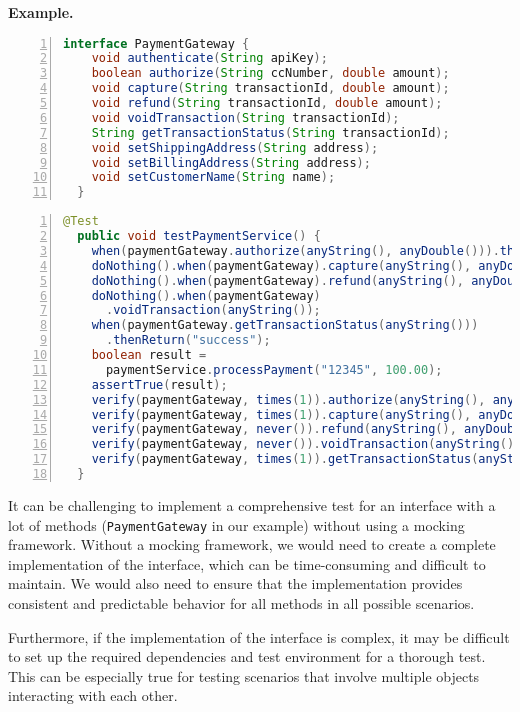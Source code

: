\documentclass[conference]{IEEEtran}
\begin{document}
\textbf{Example. }
\begin{lstlisting}[basicstyle=\ttfamily,
numbers=left,numbersep=0pt,basicstyle=\scriptsize\ttfamily,language = Java, framesep=4.5mm, framexleftmargin=1.0mm, captionpos=b, escapechar=|, morekeywords={@Test}]
  interface PaymentGateway {
    void authenticate(String apiKey);
    boolean authorize(String ccNumber, double amount);
    void capture(String transactionId, double amount);
    void refund(String transactionId, double amount);
    void voidTransaction(String transactionId);
    String getTransactionStatus(String transactionId);
    void setShippingAddress(String address);
    void setBillingAddress(String address);
    void setCustomerName(String name);
  }
\end{lstlisting}

\begin{lstlisting}[basicstyle=\ttfamily,
numbers=left,numbersep=0pt,basicstyle=\scriptsize\ttfamily,language = Java, framesep=4.5mm, framexleftmargin=1.0mm, captionpos=b, escapechar=|, morekeywords={@Test}]
  @Test
  public void testPaymentService() {
    when(paymentGateway.authorize(anyString(), anyDouble())).thenReturn(true);
    doNothing().when(paymentGateway).capture(anyString(), anyDouble());
    doNothing().when(paymentGateway).refund(anyString(), anyDouble());
    doNothing().when(paymentGateway)
      .voidTransaction(anyString());
    when(paymentGateway.getTransactionStatus(anyString()))
      .thenReturn("success");
    boolean result = 
      paymentService.processPayment("12345", 100.00);
    assertTrue(result);
    verify(paymentGateway, times(1)).authorize(anyString(), anyDouble());
    verify(paymentGateway, times(1)).capture(anyString(), anyDouble());
    verify(paymentGateway, never()).refund(anyString(), anyDouble());
    verify(paymentGateway, never()).voidTransaction(anyString());
    verify(paymentGateway, times(1)).getTransactionStatus(anyString());
  }
\end{lstlisting}

It can be challenging to implement a comprehensive test for an interface with a lot of methods (\texttt{PaymentGateway} in our example) without using a mocking framework. Without a mocking framework, we would need to create a complete implementation of the interface, which can be time-consuming and difficult to maintain. We would also need to ensure that the implementation provides consistent and predictable behavior for all methods in all possible scenarios.

Furthermore, if the implementation of the interface is complex, it may be difficult to set up the required dependencies and test environment for a thorough test. This can be especially true for testing scenarios that involve multiple objects interacting with each other.
\end{document}
